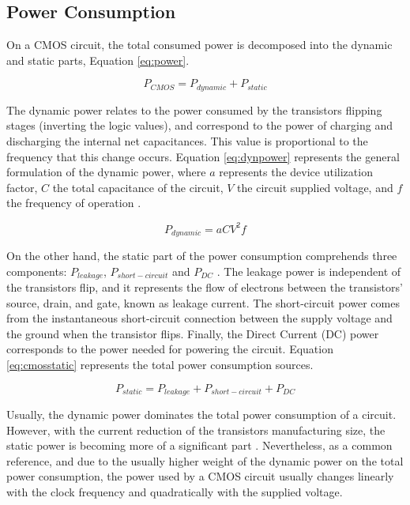 \subsection{Power Consumption}
\label{sec:power_consumption}
On a CMOS circuit, the total consumed power is decomposed into the dynamic and static parts, Equation \ref{eq:power}.

\begin{equation}
    P_{CMOS} = P_{dynamic} + P_{static}
    \label{eq:power}
\end{equation}

The dynamic power relates to the power consumed by the transistors flipping stages (inverting the logic values), and correspond to the power of charging and discharging the internal net capacitances. This value is proportional to the frequency that this change occurs. Equation \ref{eq:dynpower} represents the general formulation of the dynamic power, where $a$ represents the device utilization factor, $C$ the total capacitance of the circuit, $V$ the circuit supplied voltage, and $f$ the frequency of operation \cite{gonzalez_supply_1997}.

\begin{equation}
    P_{dynamic} = aCV^2f
    \label{eq:dynpower}
\end{equation}

On the other hand, the static part of the power consumption comprehends three components: $P_{leakage}$, $P_{short-circuit}$ and $P_{DC}$ \cite{mei_survey_2016}. The leakage power is independent of the transistors flip, and it represents the flow of electrons between the transistors' source, drain, and gate, known as leakage current. The short-circuit power comes from the instantaneous short-circuit connection between the supply voltage and the ground when the transistor flips. Finally, the Direct Current (DC) power corresponds to the power needed for powering the circuit. Equation \ref{eq:cmosstatic} represents the total power consumption sources.

\begin{equation}
    P_{static} = P_{leakage} + P_{short-circuit} + P_{DC}
    \label{eq:cmosstatic}
\end{equation}

Usually, the dynamic power dominates the total power consumption of a circuit. However, with the current reduction of the transistors manufacturing size, the static power is becoming more of a significant part \cite{s._hong_modeling_2012} \cite{hong_integrated_2010}. Nevertheless, as a common reference, and due to the usually higher weight of the dynamic power on the total power consumption, the power used by a CMOS circuit usually changes linearly with the clock frequency and quadratically with the supplied voltage.


